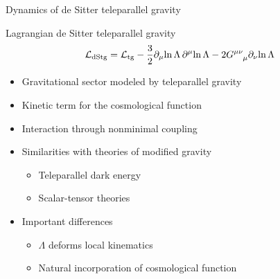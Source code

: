 \documentclass[t,hyperref={bookmarks=false}]{beamer}
\newcommand{\ind}{\indices}
\newcommand{\pd}{\partial}
\newcommand{\bitem}{\begin{itemize}}
\newcommand{\eitem}{\end{itemize}}
\begin{document}
\begin{frame}{Dynamics of de Sitter teleparallel gravity}

\begin{block}{Lagrangian de Sitter teleparallel gravity}
\begin{equation*}
  \mathcal{L}_\text{dStg} = \mathcal{L}_\text{tg} - \frac{3}{2} 
  \pd_\mu\!  \ln \Lambda\, \pd^\mu\! \ln \Lambda 
  - 2 G\ind{^{\mu\nu}_\mu} \pd_\nu\! \ln \Lambda
\end{equation*}
\end{block}

\bitem
\item<2-> Gravitational sector modeled by teleparallel gravity
\item<2-> Kinetic term for the cosmological function
\item<2-> Interaction through nonminimal coupling
\item<3-> Similarities with theories of modified gravity
  \bitem
  \item Teleparallel dark energy
  \item Scalar-tensor theories
  \eitem
\item<4-> Important differences
  \bitem
  \item $\Lambda$ deforms local kinematics
  \item Natural incorporation of cosmological function
  \eitem
\eitem

\end{frame}
\end{document}
